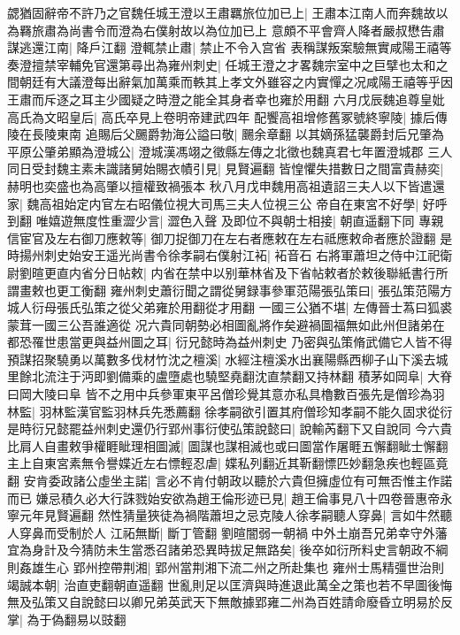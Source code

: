 勰猶固辭帝不許乃之官魏任城王澄以王肅羈旅位加已上|{
	王肅本江南人而奔魏故以為羇旅肅為尚書令而澄為右僕射故以為位加已上}
意頗不平會齊人降者嚴叔懋告肅謀逃還江南|{
	降戶江翻}
澄輒禁止肅|{
	禁止不令入宫省}
表稱謀叛案驗無實咸陽王禧等奏澄擅禁宰輔免官還第尋出為雍州刺史|{
	任城王澄之才畧魏宗室中之巨擘也太和之間朝廷有大議澄每出辭氣加萬乘而軼其上孝文外雖容之内實憚之况咸陽王禧等乎因王肅而斥逐之耳主少國疑之時澄之能全其身者幸也雍於用翻}
六月戊辰魏追尊皇妣高氏為文昭皇后|{
	高氏卒見上卷明帝建武四年}
配饗高祖增修舊冢號終寧陵|{
	據后傳陵在長陵東南}
追賜后父颺爵勃海公謚曰敬|{
	颺余章翻}
以其嫡孫猛襲爵封后兄肇為平原公肇弟顯為澄城公|{
	澄城漢馮翊之徵縣左傳之北徵也魏真君七年置澄城郡}
三人同日受封魏主素未識諸舅始賜衣幘引見|{
	見賢遍翻}
皆惶懼失措數日之間富貴赫奕|{
	赫明也奕盛也為高肇以擅權致禍張本}
秋八月戊申魏用高祖遺詔三夫人以下皆遣還家|{
	魏高祖始定内官左右昭儀位視大司馬三夫人位視三公}
帝自在東宮不好學|{
	好呼到翻}
唯嬉遊無度性重澀少言|{
	澀色入聲}
及即位不與朝士相接|{
	朝直遥翻下同}
專親信宦官及左右御刀應敕等|{
	御刀捉御刀在左右者應敕在左右祗應敕命者應於證翻}
是時揚州刺史始安王遥光尚書令徐孝嗣右僕射江袥|{
	袥音石}
右將軍蕭坦之侍中江祀衛尉劉暄更直内省分日帖敕|{
	内省在禁中以别華林省及下省帖敕者於敕後聯紙書行所謂畫敕也更工衡翻}
雍州刺史蕭衍聞之謂從舅録事參軍范陽張弘策曰|{
	張弘策范陽方城人衍母張氏弘策之從父弟雍於用翻從才用翻}
一國三公猶不堪|{
	左傳晉士蒍曰狐裘蒙茸一國三公吾誰適從}
况六貴同朝勢必相圖亂將作矣避禍圖福無如此州但諸弟在都恐罹世患當更與益州圖之耳|{
	衍兄懿時為益州刺史}
乃密與弘策脩武備它人皆不得預謀招聚驍勇以萬數多伐材竹沈之檀溪|{
	水經注檀溪水出襄陽縣西柳子山下溪去城里餘北流注于沔即劉備乘的盧墮處也驍堅堯翻沈直禁翻又持林翻}
積茅如岡阜|{
	大脊曰岡大陵曰阜}
皆不之用中兵參軍東平呂僧珍覺其意亦私具櫓數百張先是僧珍為羽林監|{
	羽林監漢官監羽林兵先悉薦翻}
徐孝嗣欲引置其府僧珍知孝嗣不能久固求從衍是時衍兄懿罷益州刺史還仍行郢州事衍使弘策說懿曰|{
	說輸芮翻下又自說同}
今六貴比肩人自畫敕爭權睚眦理相圖滅|{
	圖謀也謀相滅也或曰圖當作屠睚五懈翻眦士懈翻}
主上自東宮素無令譽媟近左右慓輕忍虐|{
	媟私列翻近其靳翻慓匹妙翻急疾也輕區竟翻}
安肯委政諸公虛坐主諾|{
	言必不肯付朝政以聽於六貴但擁虛位有可無否惟主作諾而已}
嫌忌積久必大行誅戮始安欲為趙王倫形迹已見|{
	趙王倫事見八十四卷晉惠帝永寧元年見賢遍翻}
然性猜量狹徒為禍階蕭坦之忌克陵人徐孝嗣聽人穿鼻|{
	言如牛然聽人穿鼻而受制於人}
江祏無斷|{
	斷丁管翻}
劉暄闇弱一朝禍中外土崩吾兄弟幸守外藩宜為身計及今猜防未生當悉召諸弟恐異時拔足無路矣|{
	後卒如衍所料史言朝政不綱則姦雄生心}
郢州控帶荆湘|{
	郢州當荆湘下流二州之所赴集也}
雍州士馬精彊世治則竭誠本朝|{
	治直吏翻朝直遥翻}
世亂則足以匡濟與時進退此萬全之策也若不早圖後悔無及弘策又自說懿曰以卿兄弟英武天下無敵據郢雍二州為百姓請命廢昏立明易於反掌|{
	為于偽翻易以豉翻}
